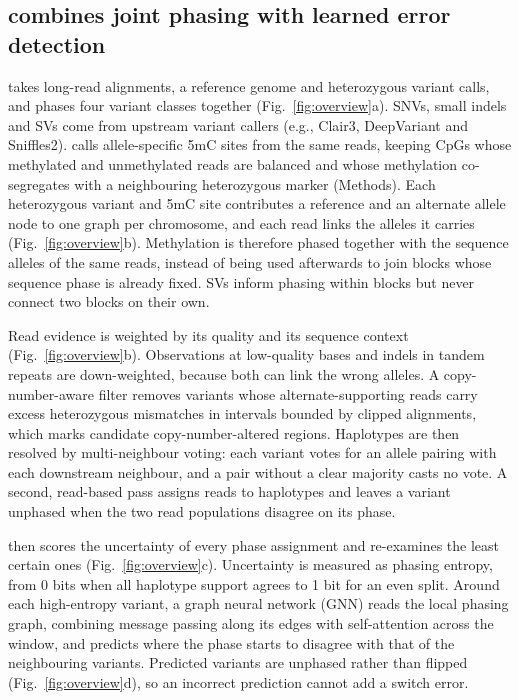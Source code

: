 \subsection*{\toolname combines joint phasing with learned error detection}
\toolname takes long-read alignments, a reference genome and heterozygous variant calls, and phases four variant classes together (Fig.~\ref{fig:overview}a). SNVs, small indels and SVs come from upstream variant callers (e.g., Clair3\cite{zheng2022clair3}, DeepVariant\cite{poplin2018deepvariant} and Sniffles2\cite{smolka2024sniffles2}). \toolname calls allele-specific 5mC sites from the same reads, keeping CpGs whose methylated and unmethylated reads are balanced and whose methylation co-segregates with a neighbouring heterozygous marker (Methods). Each heterozygous variant and 5mC site contributes a reference and an alternate allele node to one graph per chromosome, and each read links the alleles it carries (Fig.~\ref{fig:overview}b). Methylation is therefore phased together with the sequence alleles of the same reads, instead of being used afterwards to join blocks whose sequence phase is already fixed. SVs inform phasing within blocks but never connect two blocks on their own.

Read evidence is weighted by its quality and its sequence context (Fig.~\ref{fig:overview}b). Observations at low-quality bases and indels in tandem repeats are down-weighted, because both can link the wrong alleles. A copy-number-aware filter removes variants whose alternate-supporting reads carry excess heterozygous mismatches in intervals bounded by clipped alignments, which marks candidate copy-number-altered regions. Haplotypes are then resolved by multi-neighbour voting: each variant votes for an allele pairing with each downstream neighbour, and a pair without a clear majority casts no vote. A second, read-based pass assigns reads to haplotypes and leaves a variant unphased when the two read populations disagree on its phase.

\toolname then scores the uncertainty of every phase assignment and re-examines the least certain ones (Fig.~\ref{fig:overview}c). Uncertainty is measured as phasing entropy, from 0 bits when all haplotype support agrees to 1 bit for an even split. Around each high-entropy variant, a graph neural network (GNN) reads the local phasing graph, combining message passing along its edges with self-attention across the window, and predicts where the phase starts to disagree with that of the neighbouring variants. Predicted variants are unphased rather than flipped (Fig.~\ref{fig:overview}d), so an incorrect prediction cannot add a switch error.

